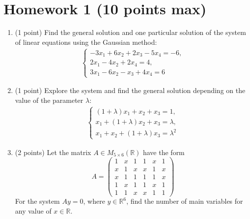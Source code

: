 \documentclass{article}
\begin{document}
\section*{Homework 1 (10 points max)}
\begin{enumerate}
  \item (1 point) Find the general solution and one particular solution of the system of linear equations using the Gaussian method:
  \begin{align*}
    \begin{cases}
      -3x_1 + 6x_2 + 2x_3 - 5x_4 = -6, \\
      2x_1 - 4x_2 + 2x_4 = 4, \\
      3x_1 - 6x_2 - x_3 + 4x_4 = 6
    \end{cases}
  \end{align*}

  \item (1 point) Explore the system and find the general solution depending on the value of the parameter $\lambda$:
  \begin{align*}
    \begin{cases}
      (1 + \lambda)x_1 + x_2 + x_3 = 1, \\
      x_1 + (1 + \lambda)x_2 + x_3 = \lambda, \\
      x_1 + x_2 + (1 + \lambda)x_3 = \lambda^2
    \end{cases}
  \end{align*}

  \item (2 points) Let the matrix $A \in M_{5\times6}(\mathbb{R})$ have the form
  \begin{equation*}
    A = \begin{pmatrix}
      1 & x & 1 & 1 & x & 1 \\
      x & 1 & x & x & 1 & x \\
      x & 1 & 1 & 1 & 1 & x \\
      1 & x & 1 & 1 & x & 1 \\
      1 & 1 & x & x & 1 & 1
    \end{pmatrix}
  \end{equation*}
  For the system $Ay = 0$, where $y \in \mathbb{R}^6$, find the number of main variables for any value of $x \in \mathbb{R}$.


\end{enumerate}
\end{document}

